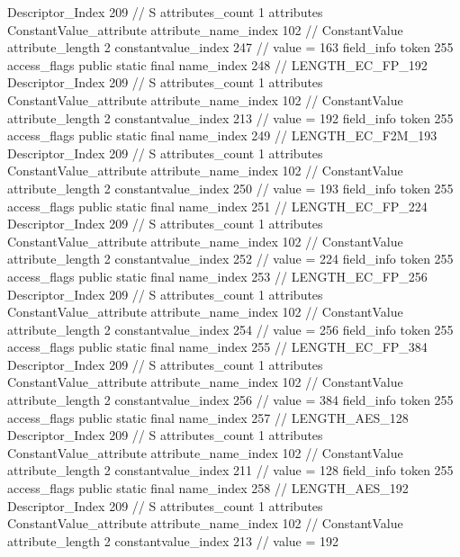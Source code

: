 {{{{{				Descriptor_Index	209		// S
				attributes_count	1
				attributes {
				ConstantValue_attribute {
					attribute_name_index	102		// ConstantValue
					attribute_length	2
					constantvalue_index	247		// value = 163
				}
				}
			}
			field_info {
				token	255
				access_flags	public static final
				name_index	248		// LENGTH_EC_FP_192
				Descriptor_Index	209		// S
				attributes_count	1
				attributes {
				ConstantValue_attribute {
					attribute_name_index	102		// ConstantValue
					attribute_length	2
					constantvalue_index	213		// value = 192
				}
				}
			}
			field_info {
				token	255
				access_flags	public static final
				name_index	249		// LENGTH_EC_F2M_193
				Descriptor_Index	209		// S
				attributes_count	1
				attributes {
				ConstantValue_attribute {
					attribute_name_index	102		// ConstantValue
					attribute_length	2
					constantvalue_index	250		// value = 193
				}
				}
			}
			field_info {
				token	255
				access_flags	public static final
				name_index	251		// LENGTH_EC_FP_224
				Descriptor_Index	209		// S
				attributes_count	1
				attributes {
				ConstantValue_attribute {
					attribute_name_index	102		// ConstantValue
					attribute_length	2
					constantvalue_index	252		// value = 224
				}
				}
			}
			field_info {
				token	255
				access_flags	public static final
				name_index	253		// LENGTH_EC_FP_256
				Descriptor_Index	209		// S
				attributes_count	1
				attributes {
				ConstantValue_attribute {
					attribute_name_index	102		// ConstantValue
					attribute_length	2
					constantvalue_index	254		// value = 256
				}
				}
			}
			field_info {
				token	255
				access_flags	public static final
				name_index	255		// LENGTH_EC_FP_384
				Descriptor_Index	209		// S
				attributes_count	1
				attributes {
				ConstantValue_attribute {
					attribute_name_index	102		// ConstantValue
					attribute_length	2
					constantvalue_index	256		// value = 384
				}
				}
			}
			field_info {
				token	255
				access_flags	public static final
				name_index	257		// LENGTH_AES_128
				Descriptor_Index	209		// S
				attributes_count	1
				attributes {
				ConstantValue_attribute {
					attribute_name_index	102		// ConstantValue
					attribute_length	2
					constantvalue_index	211		// value = 128
				}
				}
			}
			field_info {
				token	255
				access_flags	public static final
				name_index	258		// LENGTH_AES_192
				Descriptor_Index	209		// S
				attributes_count	1
				attributes {
				ConstantValue_attribute {
					attribute_name_index	102		// ConstantValue
					attribute_length	2
					constantvalue_index	213		// value = 192
}}}}}}}
